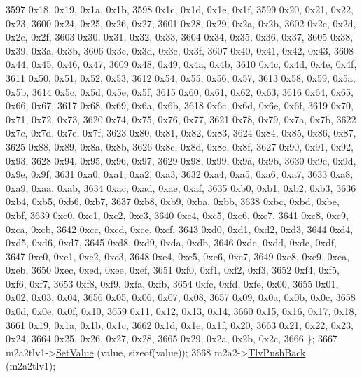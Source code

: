 \begin{DoxyCode}
3597       0x18, 0x19, 0x1a, 0x1b,
3598       0x1c, 0x1d, 0x1e, 0x1f,
3599       0x20, 0x21, 0x22, 0x23,
3600       0x24, 0x25, 0x26, 0x27,
3601       0x28, 0x29, 0x2a, 0x2b,
3602       0x2c, 0x2d, 0x2e, 0x2f,
3603       0x30, 0x31, 0x32, 0x33,
3604       0x34, 0x35, 0x36, 0x37,
3605       0x38, 0x39, 0x3a, 0x3b,
3606       0x3c, 0x3d, 0x3e, 0x3f,
3607       0x40, 0x41, 0x42, 0x43,
3608       0x44, 0x45, 0x46, 0x47,
3609       0x48, 0x49, 0x4a, 0x4b,
3610       0x4c, 0x4d, 0x4e, 0x4f,
3611       0x50, 0x51, 0x52, 0x53,
3612       0x54, 0x55, 0x56, 0x57,
3613       0x58, 0x59, 0x5a, 0x5b,
3614       0x5c, 0x5d, 0x5e, 0x5f,
3615       0x60, 0x61, 0x62, 0x63,
3616       0x64, 0x65, 0x66, 0x67,
3617       0x68, 0x69, 0x6a, 0x6b,
3618       0x6c, 0x6d, 0x6e, 0x6f,
3619       0x70, 0x71, 0x72, 0x73,
3620       0x74, 0x75, 0x76, 0x77,
3621       0x78, 0x79, 0x7a, 0x7b,
3622       0x7c, 0x7d, 0x7e, 0x7f,
3623       0x80, 0x81, 0x82, 0x83,
3624       0x84, 0x85, 0x86, 0x87,
3625       0x88, 0x89, 0x8a, 0x8b,
3626       0x8c, 0x8d, 0x8e, 0x8f,
3627       0x90, 0x91, 0x92, 0x93,
3628       0x94, 0x95, 0x96, 0x97,
3629       0x98, 0x99, 0x9a, 0x9b,
3630       0x9c, 0x9d, 0x9e, 0x9f,
3631       0xa0, 0xa1, 0xa2, 0xa3,
3632       0xa4, 0xa5, 0xa6, 0xa7,
3633       0xa8, 0xa9, 0xaa, 0xab,
3634       0xac, 0xad, 0xae, 0xaf,
3635       0xb0, 0xb1, 0xb2, 0xb3,
3636       0xb4, 0xb5, 0xb6, 0xb7,
3637       0xb8, 0xb9, 0xba, 0xbb,
3638       0xbc, 0xbd, 0xbe, 0xbf,
3639       0xc0, 0xc1, 0xc2, 0xc3,
3640       0xc4, 0xc5, 0xc6, 0xc7,
3641       0xc8, 0xc9, 0xca, 0xcb,
3642       0xcc, 0xcd, 0xce, 0xcf,
3643       0xd0, 0xd1, 0xd2, 0xd3,
3644       0xd4, 0xd5, 0xd6, 0xd7,
3645       0xd8, 0xd9, 0xda, 0xdb,
3646       0xdc, 0xdd, 0xde, 0xdf,
3647       0xe0, 0xe1, 0xe2, 0xe3,
3648       0xe4, 0xe5, 0xe6, 0xe7,
3649       0xe8, 0xe9, 0xea, 0xeb,
3650       0xec, 0xed, 0xee, 0xef,
3651       0xf0, 0xf1, 0xf2, 0xf3,
3652       0xf4, 0xf5, 0xf6, 0xf7,
3653       0xf8, 0xf9, 0xfa, 0xfb,
3654       0xfc, 0xfd, 0xfe, 0x00,
3655       0x01, 0x02, 0x03, 0x04,
3656       0x05, 0x06, 0x07, 0x08,
3657       0x09, 0x0a, 0x0b, 0x0c,
3658       0x0d, 0x0e, 0x0f, 0x10,
3659       0x11, 0x12, 0x13, 0x14,
3660       0x15, 0x16, 0x17, 0x18,
3661       0x19, 0x1a, 0x1b, 0x1c,
3662       0x1d, 0x1e, 0x1f, 0x20,
3663       0x21, 0x22, 0x23, 0x24,
3664       0x25, 0x26, 0x27, 0x28,
3665       0x29, 0x2a, 0x2b, 0x2c,
3666     \};
3667     m2a2tlv1->\hyperlink{classns3_1_1PbbTlv_a1ca7d32f9b68990225f3267c2cc09f11}{SetValue} (value, \textcolor{keyword}{sizeof}(value));
3668     m2a2->\hyperlink{classns3_1_1PbbAddressBlock_a6e33cd1452dd3ff753de3e3c99e473a5}{TlvPushBack} (m2a2tlv1);

\end{DoxyCode}
